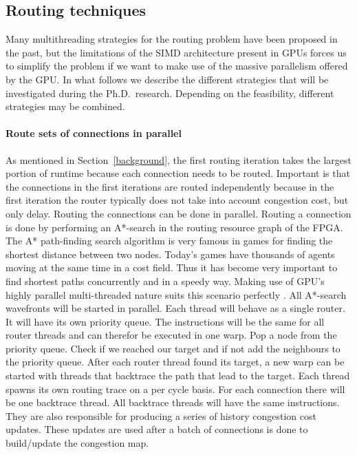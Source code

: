 \documentclass[a4paper,oneside,12pt]{article}
\begin{document}
\subsection{Routing techniques}\label{routetech}

Many multithreading strategies for the routing problem have been proposed in the past, but the limitations of the SIMD architecture present in GPUs forces us to simplify the problem if we want to make use of the massive parallelism offered by the GPU.
In what follows we describe the different strategies that will be investigated during the Ph.D.\ research. Depending on the feasibility, different strategies may be combined.

\paragraph{Route sets of connections in parallel} 
As mentioned in Section~\ref{background}, the first routing iteration takes the largest portion of runtime because each connection needs to be routed.
Important is that the connections in the first iterations are routed independently because in the first iteration the router typically does not take into account congestion cost, but only delay. Routing the connections can be done in parallel. Routing a connection is done by performing an A*-search in the routing resource graph of the FPGA.
The A* path-finding search algorithm is very famous in games for finding the shortest distance between two nodes. Today's games have thousands of agents moving at the same time in a cost field. Thus it has become very important to find shortest paths concurrently and in a speedy way. Making use of GPU's highly parallel multi-threaded nature suits this scenario perfectly \cite{bleiweiss2008gpu,bleiweiss2012system}.
 All A*-search wavefronts will be started in parallel. Each thread will behave as a single router. It will have its own priority queue. The instructions will be the same for all router threads and can therefor be executed in one warp. Pop a node from the priority queue. Check if we reached our target and if not add the neighbours to the priority queue. After each router thread found its target, a new warp can be started with threads that backtrace the path that lead to the target. Each thread spawns its own routing trace on a per cycle basis. For each connection there will be one backtrace thread. All backtrace threads will have the same instructions. They are also responsible for producing a series of history congestion cost updates. These updates are used after a batch of connections is done to build/update the congestion map.
\end{document}
